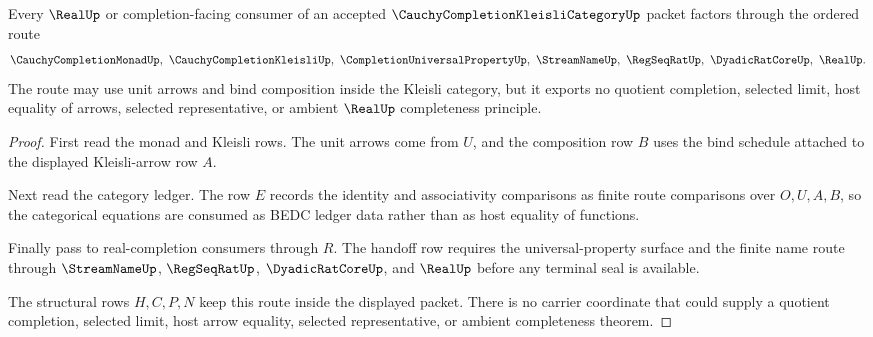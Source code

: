 \begin{theorem}
\label{thm:cauchy-completion-kleisli-category-real-completion-handoff}
Every $\RealUp$ or completion-facing consumer of an accepted $\CauchyCompletionKleisliCategoryUp$ packet factors through the ordered route
$$
\CauchyCompletionMonadUp,\ \CauchyCompletionKleisliUp,\ \CompletionUniversalPropertyUp,\ \StreamNameUp,\ \RegSeqRatUp,\ \DyadicRatCoreUp,\ \RealUp .
$$
The route may use unit arrows and bind composition inside the Kleisli category, but it exports no quotient completion, selected limit, host equality of arrows, selected representative, or ambient $\RealUp$ completeness principle.
\end{theorem}
\begin{proof}
First read the monad and Kleisli rows. The unit arrows come from $U$, and the composition row $B$ uses the bind schedule attached to the displayed Kleisli-arrow row $A$.

Next read the category ledger. The row $E$ records the identity and associativity comparisons as finite route comparisons over $O,U,A,B$, so the categorical equations are consumed as BEDC ledger data rather than as host equality of functions.

Finally pass to real-completion consumers through $R$. The handoff row requires the universal-property surface and the finite name route through $\StreamNameUp$, $\RegSeqRatUp$, $\DyadicRatCoreUp$, and $\RealUp$ before any terminal seal is available.

The structural rows $H,C,P,N$ keep this route inside the displayed packet. There is no carrier coordinate that could supply a quotient completion, selected limit, host arrow equality, selected representative, or ambient completeness theorem.
\end{proof}



